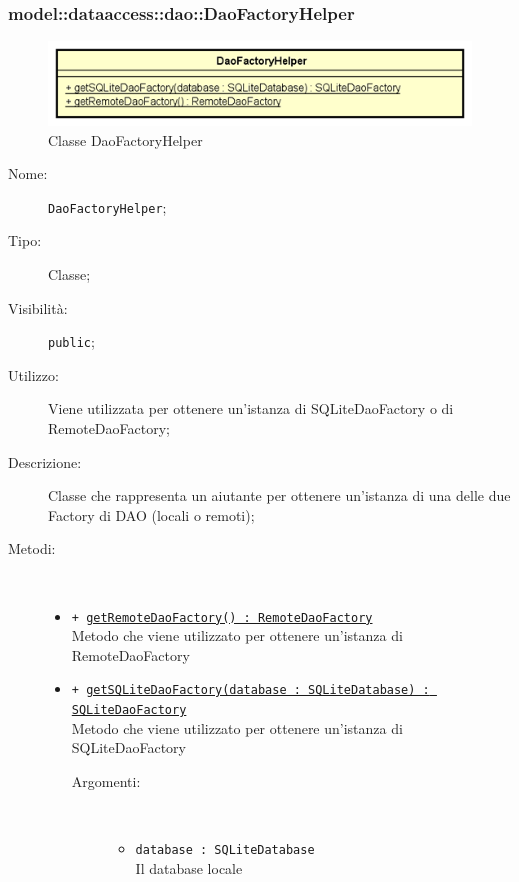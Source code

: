 \documentclass[../DefinizioneDiProdotto.tex]{subfiles}
\begin{document}
\subsubsection{model::dataaccess::dao::DaoFactoryHelper}

    \begin{figure}[H]
        \centering
        \includegraphics{img/DaoFactoryHelper.png}
        \caption{Classe DaoFactoryHelper}\label{fig:model::dataaccess::dao::DaoFactoryHelper} 
    \end{figure}
    \begin{description}
\item[Nome:] \texttt{DaoFactoryHelper};
\item[Tipo:] Classe;
\item[Visibilità:] \texttt{public};
\item[Utilizzo:] Viene utilizzata per ottenere un'istanza di SQLiteDaoFactory o di RemoteDaoFactory;
\item[Descrizione:] Classe che rappresenta un aiutante per ottenere un'istanza di una delle due Factory di DAO (locali o remoti);
\item[Metodi:] \
\begin{itemize}
\item \texttt{+ \underline{getRemoteDaoFactory() : RemoteDaoFactory}}\\
Metodo che viene utilizzato per ottenere un'istanza di RemoteDaoFactory
 \item \texttt{+ \underline{getSQLiteDaoFactory(database : SQLiteDatabase) : SQLiteDaoFactory}}\\
Metodo che viene utilizzato per ottenere un'istanza di SQLiteDaoFactory
 \begin{description}
\item[Argomenti:] \
\begin{itemize}
\item \texttt{database : SQLiteDatabase}\\
Il database locale\end{itemize}
\end{description}
\end{itemize}
\end{description}
\end{document}
